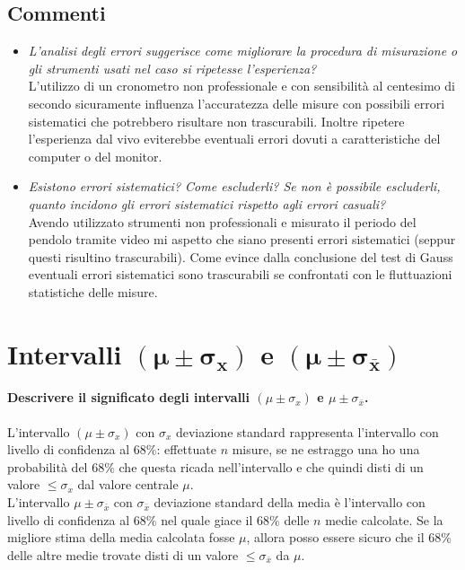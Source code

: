 \documentclass{article}
\begin{document}
	\subsection{Commenti}
	\begin{itemize}
		\item \textit{L'analisi degli errori suggerisce come migliorare la procedura di misurazione o gli strumenti usati nel caso si ripetesse l'esperienza?} \\
		
		\noindent
		L'utilizzo di un cronometro non professionale e con sensibilità al centesimo di secondo sicuramente influenza l'accuratezza delle misure con possibili errori sistematici che potrebbero risultare non trascurabili. Inoltre ripetere l'esperienza dal vivo eviterebbe eventuali errori dovuti a caratteristiche del computer o del monitor.
		
		\item \textit{Esistono errori sistematici? Come escluderli? Se non è possibile escluderli, quanto incidono gli errori sistematici rispetto agli errori casuali?} \\
		
		\noindent
		Avendo utilizzato strumenti non professionali e misurato il periodo del pendolo tramite video mi aspetto che siano presenti errori sistematici (seppur questi risultino trascurabili). Come evince dalla conclusione del test di Gauss eventuali errori sistematici sono trascurabili se confrontati con le fluttuazioni statistiche delle misure.
	\end{itemize}
	

	\section{Intervalli $\mathbf{(\mu \pm \sigma_x)}$ e $\mathbf{(\mu \pm \sigma_{\bar{x}})}$}
	\paragraph{Descrivere il significato degli intervalli $(\mu \pm \sigma_x)$ e $\mu \pm \sigma_{\bar{x}}$.}  
	L'intervallo $(\mu \pm \sigma_x)$ con $\sigma_x$ deviazione standard rappresenta l'intervallo con livello di confidenza al $68\%$: effettuate $n$ misure, se ne estraggo una ho una probabilità del $68\%$ che questa ricada nell'intervallo e che quindi disti di un valore $ \leq \sigma_{x}$ dal valore centrale $\mu$.  \\
	
	\noindent
	L'intervallo $\mu \pm \sigma_{\bar{x}}$ con $\sigma_{\bar{x}}$ deviazione standard della media è l'intervallo con livello di confidenza al $68\%$ nel quale giace il $68\%$ delle $n$ medie calcolate. Se la migliore stima della media calcolata fosse $\mu$, allora posso essere sicuro che il $68\%$ delle altre medie trovate disti di un valore $\leq \sigma_{\bar{x}}$ da $\mu$. \\ \\
	
\end{document}
